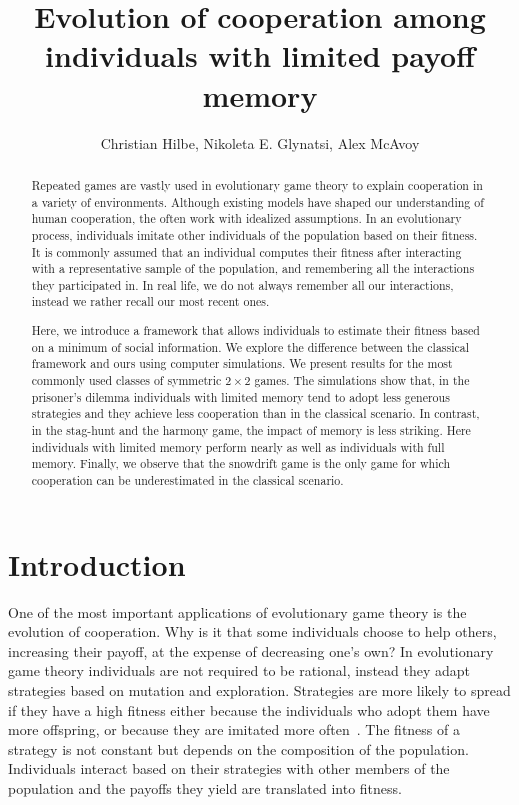 \documentclass[11pt]{article}
\title{
\bf  \sffamily \LARGE Evolution of cooperation among individuals with limited payoff memory\\}
\date{}
\author{Christian Hilbe, Nikoleta E. Glynatsi, Alex McAvoy}
\theoremstyle{plainCl1}
\theoremstyle{plainCl2}
\begin{document}
\maketitle

\begin{abstract}
Repeated games are vastly used in evolutionary game theory to explain
cooperation in a variety of environments. Although existing models have shaped
our understanding of human cooperation, the often work with idealized
assumptions. In an evolutionary process, individuals imitate other individuals
of the population based on their fitness. It is commonly assumed that an
individual computes their fitness after interacting with a representative sample
of the population, and remembering all the interactions they participated in. In
real life, we do not always remember all our interactions, instead we rather
recall our most recent ones.

Here, we introduce a framework that allows individuals to estimate their fitness
based on a minimum of social information. We explore the difference between the
classical framework and ours using computer simulations. We present results for
the most commonly used classes of symmetric \(2 \times 2\) games. The
simulations show that, in the prisoner's dilemma individuals with limited memory
tend to adopt less generous strategies and they achieve less cooperation than in
the classical scenario. In contrast, in the stag-hunt and the harmony game, the
impact of memory is less striking. Here individuals with limited memory perform
nearly as well as individuals with full memory. Finally, we observe that the
snowdrift game is the only game for which cooperation can be underestimated in
the classical scenario.
\end{abstract}

\section{Introduction}

One of the most important applications of evolutionary game theory is the
evolution of cooperation. Why is it that some individuals choose to help others,
increasing their payoff, at the expense of decreasing one's own? In evolutionary
game theory individuals are not required to be rational, instead they adapt
strategies based on mutation and exploration. Strategies are more likely to
spread if they have a high fitness either because the individuals who adopt them
have more offspring, or because they are imitated more often~\cite{Wu2015}. The
fitness of a strategy is not constant but depends on the composition of the
population. Individuals interact based on their strategies with other members of
the population and the payoffs they yield are translated into fitness.
\end{document}
